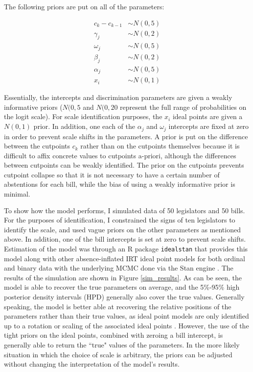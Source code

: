 	The following priors are put on all of the parameters:
	
	\begin{align*}
		c_k - c_{k-1} &\sim N(0,5)\\
		\gamma_j &\sim N(0,2)\\
		\omega_j &\sim N(0,5)\\
		\beta_j &\sim N(0,2)\\
		\alpha_j &\sim N(0,5)\\
		x_i &\sim N(0,1)
	\end{align*}

	
	Essentially, the intercepts and discrimination parameters are given a weakly informative priors ($N(0,5$ and $N(0,20$ represent the full range of probabilities on the logit scale). For scale identification purposes, the $x_i$ ideal points are given a $N(0,1)$ prior. In addition, one each of the $\alpha_j$ and $\omega_j$ intercepts are fixed at zero in order to prevent scale shifts in the parameters. A prior is put on the difference between the cutpoints $c_k$ rather than on the cutpoints themselves because it is difficult to affix concrete values to cutpoints a-priori, although the differences between cutpoints can be weakly identified. The prior on the cutpoints prevents cutpoint collapse so that it is not necessary to have a certain number of abstentions for each bill, while the bias of using a weakly informative prior is minimal.
	
	To show how the model performs, I simulated data of 50 legislators and 50 bills. For the purposes of identification, I constrained the signs of ten legislators to identify the scale, and used vague priors on the other parameters as mentioned above. In addition, one of the bill intercepts is set at zero to prevent scale shifts. Estimation of the model was through an R package \texttt{idealstan} that provides this model along with other absence-inflated IRT ideal point models for both ordinal and binary data with the underlying MCMC done via the Stan engine \parencite{carpenter2017}. The results of the simulation are shown in Figure \ref{sim_results}. As can be seen, the model is able to recover the true parameters on average, and the 5\%-95\% high posterior density intervals (HPD) generally also cover the true values. Generally speaking, the model is better able at recovering the relative positions of the parameters rather than their true values, as ideal point models are only identified up to a rotation or scaling of the associated ideal points \parencite{gelman2005}. However, the use of the tight priors on the ideal points, combined with zeroing a bill intercept, is generally able to return the ``true" values of the parameters. In the more likely situation in which the choice of scale is arbitrary, the priors can be adjusted without changing the interpretation of the model's results. 
	
